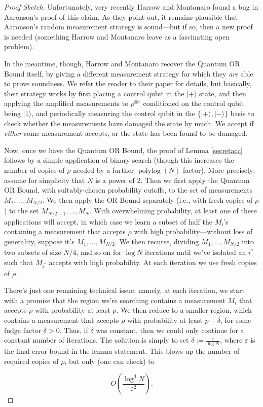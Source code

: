 \documentclass[11pt]{report}
\theoremstyle{plain}
\theoremstyle{definition}
\newcommand{\eps}{\varepsilon}
\renewcommand{\ket}[1]{|#1\rangle}
\begin{document}
\begin{proof}[Proof Sketch]
Unfortunately, very recently Harrow and Montanaro \cite{hm16} found a bug in Aaronson's proof of this claim.  As they point out, it remains plausible that Aaronson's random measurement strategy is sound---but if so, then a new proof is needed (something Harrow and Montanaro leave as a fascinating open problem).

In the meantime, though, Harrow and Montanaro recover the Quantum OR Bound itself, by giving a different measurement strategy for which they {\em are} able to prove soundness.  We refer the reader to their paper for details, but basically, their strategy works by first placing a control qubit in the $\ket{+}$ state, and then applying the amplified measurements to $\rho^{\otimes r}$ conditioned on the control qubit being $\ket{1}$, and periodically measuring the control qubit in the $\{ \ket{+}, \ket{-} \}$ basis to check whether the measurements have damaged the state by much.  We accept if {\em either} some measurement accepts, or the state has been found to be damaged.

Now, once we have the Quantum OR Bound, the proof of Lemma \ref{secretacc} follows by a simple application of binary search (though this increases the number of copies of $\rho$ needed by a further $\operatorname*{polylog}(N)$ factor).  More precisely: assume for simplicity that $N$ is a power of $2$.  Then we first apply the Quantum OR Bound, with suitably-chosen probability cutoffs, to the set of measurements $M_1,\ldots,M_{N/2}$.  We then apply the OR Bound separately (i.e., with fresh copies of $\rho$) to the set $M_{N/2+1},\ldots,M_N$.  With overwhelming probability, at least one of these applications will accept, in which case we learn a subset of half the $M_i$'s containing a measurement that accepts $\rho$ with high probability---without loss of generality, suppose it's $M_1,\ldots,M_{N/2}$. We then recurse, dividing $M_1,\ldots,M_{N/2}$ into two subsets of size $N/4$, and so on for $\log N$ iterations until we've isolated an $i^{*}$ such that $M_{i^{*}}$ accepts with high probability.  At each iteration we use fresh copies of $\rho$.

There's just one remaining technical issue: namely, at each iteration, we start with a promise that the region we're searching contains a measurement $M_i$ that accepts $\rho$ with probability at least $p$.  We then reduce to a smaller region, which contains a measurement that accepts $\rho$ with probability at least $p-\delta$, for some fudge factor $\delta > 0$.  Thus, if $\delta$ was constant, then we could only continue for a constant number of iterations.  The solution is simply to set $\delta := \frac{\eps}{\log N}$, where $\eps$ is the final error bound in the lemma statement.  This blows up the number of required copies of $\rho$, but only (one can check) to

$$O\left( \frac{\log^4 N}{\eps^2} \right).$$
\end{proof}
\end{document}
